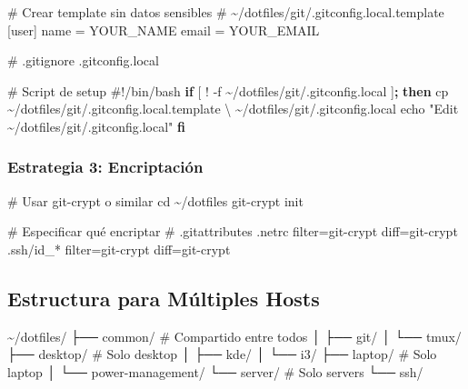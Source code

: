 \documentclass[
  doc,
  floatsintext,
  longtable,
  a4paper,
  nolmodern,
  notxfonts,
  notimes,
  12pt,
  colorlinks=true,linkcolor=blue,citecolor=blue,urlcolor=blue]{apa7}
\newenvironment{Shaded}{\begin{snugshade}}{\end{snugshade}}
\newcommand{\BuiltInTok}[1]{\textcolor[rgb]{0.00,0.23,0.31}{#1}}
\newcommand{\CommentTok}[1]{\textcolor[rgb]{0.37,0.37,0.37}{#1}}
\newcommand{\ControlFlowTok}[1]{\textcolor[rgb]{0.00,0.23,0.31}{\textbf{#1}}}
\newcommand{\DataTypeTok}[1]{\textcolor[rgb]{0.68,0.00,0.00}{#1}}
\newcommand{\ExtensionTok}[1]{\textcolor[rgb]{0.00,0.23,0.31}{#1}}
\newcommand{\FunctionTok}[1]{\textcolor[rgb]{0.28,0.35,0.67}{#1}}
\newcommand{\KeywordTok}[1]{\textcolor[rgb]{0.00,0.23,0.31}{\textbf{#1}}}
\newcommand{\NormalTok}[1]{\textcolor[rgb]{0.00,0.23,0.31}{#1}}
\newcommand{\OtherTok}[1]{\textcolor[rgb]{0.00,0.23,0.31}{#1}}
\newcommand{\StringTok}[1]{\textcolor[rgb]{0.13,0.47,0.30}{#1}}
\begin{document}
\begin{Shaded}
\begin{Highlighting}[]
\CommentTok{\# Crear template sin datos sensibles}
\CommentTok{\# \textasciitilde{}/dotfiles/git/.gitconfig.local.template}
\ExtensionTok{[user]}
    \ExtensionTok{name}\NormalTok{ = YOUR\_NAME}
    \ExtensionTok{email}\NormalTok{ = YOUR\_EMAIL}

\CommentTok{\# .gitignore}
\ExtensionTok{.gitconfig.local}

\CommentTok{\# Script de setup}
\CommentTok{\#!/bin/bash}
\ControlFlowTok{if} \BuiltInTok{[} \OtherTok{!} \OtherTok{{-}f}\NormalTok{ \textasciitilde{}/dotfiles/git/.gitconfig.local }\BuiltInTok{]}\KeywordTok{;} \ControlFlowTok{then}
    \FunctionTok{cp}\NormalTok{ \textasciitilde{}/dotfiles/git/.gitconfig.local.template }\DataTypeTok{\textbackslash{}}
\NormalTok{       \textasciitilde{}/dotfiles/git/.gitconfig.local}
    \BuiltInTok{echo} \StringTok{"Edit \textasciitilde{}/dotfiles/git/.gitconfig.local"}
\ControlFlowTok{fi}
\end{Highlighting}
\end{Shaded}

\subsubsection{Estrategia 3:
Encriptación}\label{estrategia-3-encriptaciuxf3n}

\begin{Shaded}
\begin{Highlighting}[]
\CommentTok{\# Usar git{-}crypt o similar}
\BuiltInTok{cd}\NormalTok{ \textasciitilde{}/dotfiles}
\ExtensionTok{git{-}crypt}\NormalTok{ init}

\CommentTok{\# Especificar qué encriptar}
\CommentTok{\# .gitattributes}
\ExtensionTok{.netrc}\NormalTok{ filter=git{-}crypt diff=git{-}crypt}
\ExtensionTok{.ssh/id\_*}\NormalTok{ filter=git{-}crypt diff=git{-}crypt}
\end{Highlighting}
\end{Shaded}

\subsection{Estructura para Múltiples
Hosts}\label{estructura-para-muxfaltiples-hosts}

\begin{Shaded}
\begin{Highlighting}[]
\ExtensionTok{\textasciitilde{}/dotfiles/}
\ExtensionTok{├──}\NormalTok{ common/              }\CommentTok{\# Compartido entre todos}
\ExtensionTok{│}\NormalTok{   ├── git/}
\ExtensionTok{│}\NormalTok{   └── tmux/}
\ExtensionTok{├──}\NormalTok{ desktop/             }\CommentTok{\# Solo desktop}
\ExtensionTok{│}\NormalTok{   ├── kde/}
\ExtensionTok{│}\NormalTok{   └── i3/}
\ExtensionTok{├──}\NormalTok{ laptop/              }\CommentTok{\# Solo laptop}
\ExtensionTok{│}\NormalTok{   └── power{-}management/}
\ExtensionTok{└──}\NormalTok{ server/              }\CommentTok{\# Solo servers}
    \ExtensionTok{└──}\NormalTok{ ssh/}
\end{Highlighting}
\end{Shaded}
\end{document}
